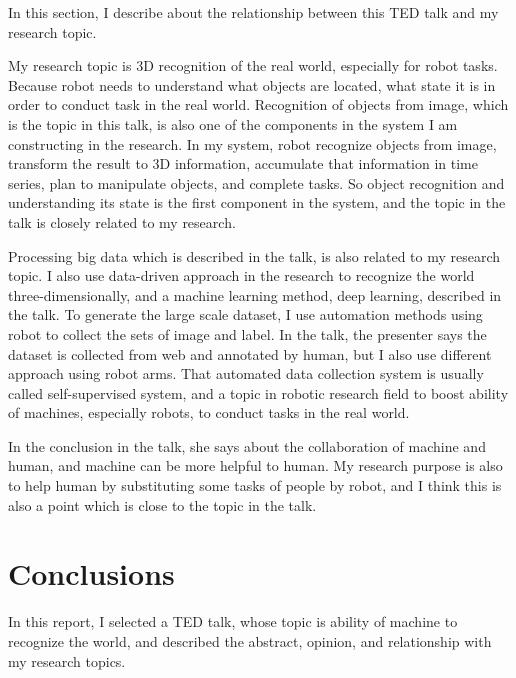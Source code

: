 \documentclass[letter, twocolumn]{ieeeconf}
\begin{document}
In this section, I describe about the relationship between this TED talk and my research topic.

My research topic is 3D recognition of the real world, especially for robot tasks. Because
robot needs to understand what objects are located, what state it is
in order to conduct task in the real world.
Recognition of objects from image, which is the topic in this talk, is also one of the components
in the system I am constructing in the research.
In my system, robot recognize objects from image,
transform the result to 3D information, accumulate that information in time series,
plan to manipulate objects, and complete tasks.
So object recognition and understanding its state is the first component in the system,
and the topic in the talk is closely related to my research.

Processing big data which is described in the talk, is also related to my research topic.
I also use data-driven approach in the research to recognize the world three-dimensionally,
and a machine learning method, deep learning, described in the talk.
To generate the large scale dataset,
I use automation methods using robot to collect the sets of image and label.
In the talk, the presenter says the dataset is collected from web and annotated by human,
but I also use different approach using robot arms. That automated data collection system
is usually called self-supervised system, and a topic in robotic research field
to boost ability of machines, especially robots, to conduct tasks in the real world.

In the conclusion in the talk, she says about the collaboration of machine and human,
and machine can be more helpful to human.
My research purpose is also to help human by substituting some tasks of people by robot,
and I think this is also a point which is close to the topic in the talk.

\section{Conclusions}

In this report, I selected a TED talk, whose topic is ability of machine to recognize the world,
and described the abstract, opinion, and relationship with my research topics.
\end{document}
